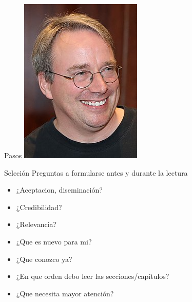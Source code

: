 \documentclass[
10pt,
aspectratio=169,
]{beamer}
\begin{document}
\begin{frame}[c]{Pasos}
\centering
\includegraphics[width=\textwidth]{linus.jpeg}
\end{frame}

\begin{frame}[c]{Seleci\'on}
Preguntas a formularse antes y durante la lectura
\begin{itemize}
\item ¿Aceptacion, diseminaci\'on?
\item ¿Credibilidad?
\item ¿Relevancia?
\item ¿Que es nuevo para mi?
\item ¿Que conozco ya?
\item ¿En que orden debo leer las secciones/cap\'itulos?
\item ¿Que necesita mayor atenci\'on?
\end{itemize}
\end{frame}
\end{document}
